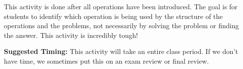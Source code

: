 \documentclass{ximera}
\begin{document}
\newpage
\begin{instructorNotes}
This activity is done after all operations have been introduced.  The goal is for students to identify which operation is being used by the structure of the operations and the problems, not necessarily by solving the problem or finding the answer.  This activity is incredibly tough!

{\bf Suggested Timing:} This activity will take an entire class period.  If we don't have time, we sometimes put this on an exam review or final review.
\end{instructorNotes}
\end{document}
